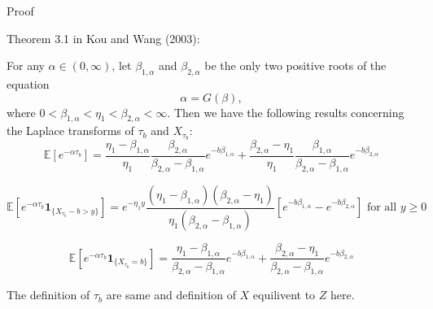 \documentclass{beamer}
\begin{document}
\begin{frame}{Proof}

    
    {\footnotesize \footnotesize
    \par Theorem 3.1 in Kou and Wang (2003):
    \vspace{1em}
    \par For any \(\alpha \in (0, \infty)\), let \(\beta_{1,\alpha}\) and \(\beta_{2,\alpha}\) be the only two positive roots of the equation  
    \[
    \alpha = G(\beta),
    \]  
    where \(0 < \beta_{1,\alpha} < \eta_1 < \beta_{2,\alpha} < \infty\). Then we have the following results concerning the Laplace transforms of \(\tau_b\) and \(X_{\tau_b}\):  
         \pause 
    \[
    \mathbb{E}[e^{-\alpha\tau_b}] = \frac{\eta_1 - \beta_{1,\alpha}}{\eta_1} \frac{\beta_{2,\alpha}}{\beta_{2,\alpha} - \beta_{1,\alpha}} e^{-b\beta_{1,\alpha}} 
    + \frac{\beta_{2,\alpha} - \eta_1}{\eta_1} \frac{\beta_{1,\alpha}}{\beta_{2,\alpha} - \beta_{1,\alpha}} e^{-b\beta_{2,\alpha}}
    \]

    \[
    \mathbb{E}[e^{-\alpha\tau_b} \mathbf{1}_{\{X_{\tau_b} - b > y\}}] = e^{-\eta_1 y} \frac{(\eta_1 - \beta_{1,\alpha})(\beta_{2,\alpha} - \eta_1)}{\eta_1 (\beta_{2,\alpha} 
    - \beta_{1,\alpha})} [e^{-b\beta_{1,\alpha}} - e^{-b\beta_{2,\alpha}}] \text{ for all } y \geq 0
    \]

    \[
    \mathbb{E}[e^{-\alpha\tau_b} \mathbf{1}_{\{X_{\tau_b} = b\}}] = \frac{\eta_1 - \beta_{1,\alpha}}{\beta_{2,\alpha} - \beta_{1,\alpha}} e^{-b\beta_{1,\alpha}} +
     \frac{\beta_{2,\alpha} - \eta_1}{\beta_{2,\alpha} - \beta_{1,\alpha}} e^{-b\beta_{2,\alpha}}
    \]
    \par The definition of $\tau_b$ are same and definition of $X$ equilivent to $Z$ here.




    }
    
\end{frame}
\end{document}
